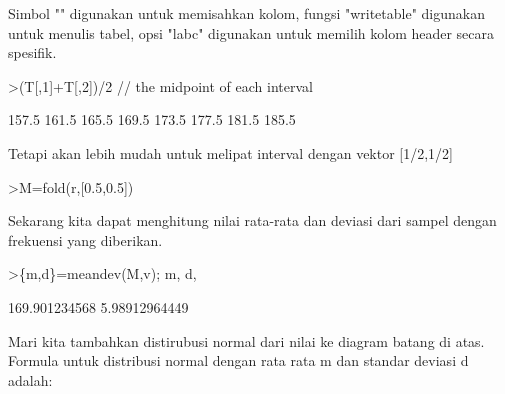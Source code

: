 \documentclass{article}
\begin{document}
\begin{eulernotebook}
\begin{eulercomment}
Simbol "\textbar{}" digunakan untuk memisahkan kolom, fungsi "writetable"
digunakan untuk menulis tabel, opsi "labc" digunakan untuk memilih
kolom header secara spesifik.

\end{eulercomment}
\begin{eulerprompt}
>(T[,1]+T[,2])/2 // the midpoint of each interval
\end{eulerprompt}
\begin{euleroutput}
          157.5 
          161.5 
          165.5 
          169.5 
          173.5 
          177.5 
          181.5 
          185.5 
\end{euleroutput}
\begin{eulercomment}
Tetapi akan lebih mudah untuk melipat interval dengan vektor [1/2,1/2]
\end{eulercomment}
\begin{eulerprompt}
>M=fold(r,[0.5,0.5])
\end{eulerprompt}
\begin{euleroutput}
  [157.5,  161.5,  165.5,  169.5,  173.5,  177.5,  181.5,  185.5]
\end{euleroutput}
\begin{eulercomment}
Sekarang kita dapat menghitung nilai rata-rata dan deviasi dari sampel
dengan frekuensi yang diberikan.
\end{eulercomment}
\begin{eulerprompt}
>\{m,d\}=meandev(M,v); m, d,
\end{eulerprompt}
\begin{euleroutput}
  169.901234568
  5.98912964449
\end{euleroutput}
\begin{eulercomment}
Mari kita tambahkan distirubusi normal dari nilai ke diagram batang di
atas. Formula untuk distribusi normal dengan rata rata m dan standar
deviasi d adalah:


\end{eulercomment}
\end{eulernotebook}
\end{document}

